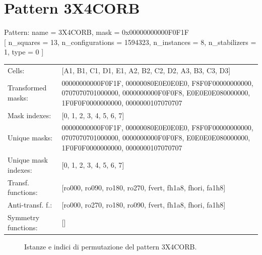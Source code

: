 \newpage

\section{Pattern 3X4CORB}

\begin{tcolorbox}[sharp corners, fontupper=\ttfamily\small, colback=white]
  \noindent Pattern: name = 3X4CORB, mask = 0x00000000000F0F1F\\
  {[} n\_squares = 13, n\_configurations = 1594323,
  n\_instances = 8, n\_stabilizers = 1, type = 0 { ]}\\[1.0ex]
  \begin{tabularx}{\textwidth}{@{} p{3.5cm} X @{}}
    Cells:               & {[}A1, B1, C1, D1, E1, A2, B2, C2, D2, A3, B3, C3, D3{]}\\[0.5ex]
    Transformed masks:   & 00000000000F0F1F, 00000080E0E0E0E0, F8F0F00000000000, 0707070701000000, 0000000000F0F0F8, E0E0E0E080000000, 1F0F0F0000000000, 0000000107070707\\[0.5ex]
    Mask indexes:        & {[}0, 1, 2, 3, 4, 5, 6, 7{]}\\[0.5ex]
    Unique masks:        & 00000000000F0F1F, 00000080E0E0E0E0, F8F0F00000000000, 0707070701000000, 0000000000F0F0F8, E0E0E0E080000000, 1F0F0F0000000000, 0000000107070707\\[0.5ex]
    Unique mask indexes: & {[}0, 1, 2, 3, 4, 5, 6, 7{]}\\[0.5ex]
    Transf. functions:   & {[}ro000, ro090, ro180, ro270, fvert, fh1a8, fhori, fa1h8{]}\\[0.5ex]
    Anti-transf. f.:     & {[}ro000, ro270, ro180, ro090, fvert, fh1a8, fhori, fa1h8{]}\\[0.5ex]
    Symmetry functions:  & {[}{]}\\[0.5ex]
  \end{tabularx}
\end{tcolorbox}

\begin{figure}[htbp]
  \centering
   \hfill
   \hfill
   \hfill
  \vspace{0.3cm}
   \hfill
   \hfill
   \hfill
  \caption{Istanze e indici di permutazione del pattern 3X4CORB.}
\end{figure}

